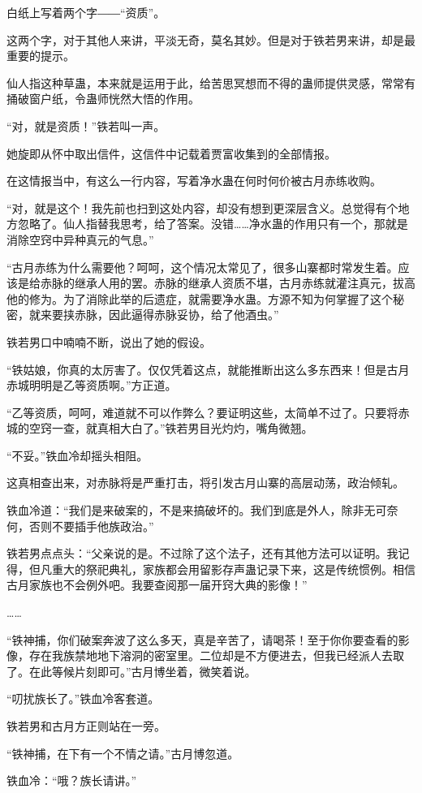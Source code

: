 \begin{this_body}
白纸上写着两个字――“资质”。

这两个字，对于其他人来讲，平淡无奇，莫名其妙。但是对于铁若男来讲，却是最重要的提示。

仙人指这种草蛊，本来就是运用于此，给苦思冥想而不得的蛊师提供灵感，常常有捅破窗户纸，令蛊师恍然大悟的作用。

“对，就是资质！”铁若叫一声。

她旋即从怀中取出信件，这信件中记载着贾富收集到的全部情报。

在这情报当中，有这么一行内容，写着净水蛊在何时何价被古月赤练收购。

“对，就是这个！我先前也扫到这处内容，却没有想到更深层含义。总觉得有个地方忽略了。仙人指替我思考，给了答案。没错……净水蛊的作用只有一个，那就是消除空窍中异种真元的气息。”

“古月赤练为什么需要他？呵呵，这个情况太常见了，很多山寨都时常发生着。应该是给赤脉的继承人用的罢。赤脉的继承人资质不堪，古月赤练就灌注真元，拔高他的修为。为了消除此举的后遗症，就需要净水蛊。方源不知为何掌握了这个秘密，就来要挟赤脉，因此逼得赤脉妥协，给了他酒虫。”

铁若男口中喃喃不断，说出了她的假设。

“铁姑娘，你真的太厉害了。仅仅凭着这点，就能推断出这么多东西来！但是古月赤城明明是乙等资质啊。”方正道。

“乙等资质，呵呵，难道就不可以作弊么？要证明这些，太简单不过了。只要将赤城的空窍一查，就真相大白了。”铁若男目光灼灼，嘴角微翘。

“不妥。”铁血冷却摇头相阻。

这真相查出来，对赤脉将是严重打击，将引发古月山寨的高层动荡，政治倾轧。

铁血冷道：“我们是来破案的，不是来搞破坏的。我们到底是外人，除非无可奈何，否则不要插手他族政治。”

铁若男点点头：“父亲说的是。不过除了这个法子，还有其他方法可以证明。我记得，但凡重大的祭祀典礼，家族都会用留影存声蛊记录下来，这是传统惯例。相信古月家族也不会例外吧。我要查阅那一届开窍大典的影像！”

……

“铁神捕，你们破案奔波了这么多天，真是辛苦了，请喝茶！至于你你要查看的影像，存在我族禁地地下溶洞的密室里。二位却是不方便进去，但我已经派人去取了。在此等候片刻即可。”古月博坐着，微笑着说。

“叨扰族长了。”铁血冷客套道。

铁若男和古月方正则站在一旁。

“铁神捕，在下有一个不情之请。”古月博忽道。

铁血冷：“哦？族长请讲。”


\end{this_body}
